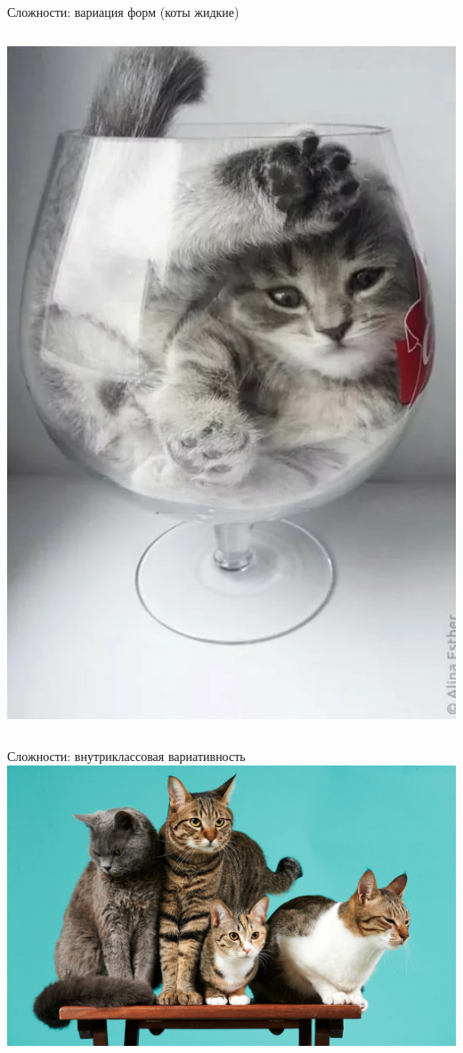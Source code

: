 \documentclass[aspectratio=169, professionalfonts]{beamer}
\begin{document}
\begin{frame}{Сложности: вариация форм (коты жидкие)}
\begin{columns}
\begin{column}{.325\linewidth}
            \includegraphics[width=\linewidth]{graphs/fig13_3.jpg}
        \end{column}
    \end{columns}
\end{frame}

\begin{frame}{Сложности: внутриклассовая вариативность}
    \centering
    \includegraphics[width=.77\linewidth]{graphs/fig14.jpg}
\end{frame}
\end{document}
